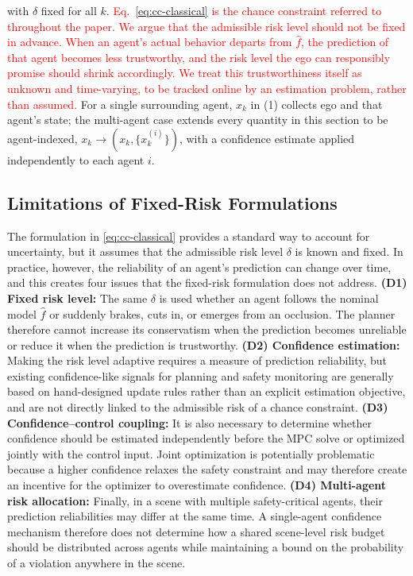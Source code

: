 \documentclass[letterpaper, 10 pt, conference]{ieeeconf}
\begin{document}
with $\delta$ fixed for all $k$. \textcolor{red}{Eq.~\eqref{eq:cc-classical} is the chance constraint referred to throughout the paper}. \textcolor{red}{We argue that the admissible risk level should not be fixed in advance. When an agent's actual behavior departs from $\hat f$, the prediction of that agent becomes less trustworthy, and the risk level the ego can responsibly promise should shrink accordingly. We treat this trustworthiness itself as unknown and time-varying, to be tracked online by an estimation problem, rather than assumed.} For a single surrounding agent, $x_k$ in (1) collects ego and that agent's state; the multi-agent case extends every quantity in this section to be agent-indexed, $x_k \to (x_k, \{x_k^{(i)}\})$, with a confidence estimate applied independently to each agent $i$.

\subsection{Limitations of Fixed-Risk Formulations}
\label{sec:difficulties}
The formulation in \eqref{eq:cc-classical} provides a standard way to account for uncertainty, but it assumes that the admissible risk level $\delta$ is known and fixed. In practice, however, the reliability of an agent's prediction can change over time, and this creates four issues that the fixed-risk formulation does not address. \textbf{(D1) Fixed risk level:} The same $\delta$ is used whether an agent follows the nominal model $\hat f$ or suddenly brakes, cuts in, or emerges from an occlusion. The planner therefore cannot increase its conservatism when the prediction becomes unreliable or reduce it when the prediction is trustworthy. \textbf{(D2) Confidence estimation:} Making the risk level adaptive requires a measure of prediction reliability, but existing confidence-like signals for planning and safety monitoring \cite{fisac2018general,tian2022safety,yao2024calmm} are generally based on hand-designed update rules rather than an explicit estimation objective, and are not directly linked to the admissible risk of a chance constraint. \textbf{(D3) Confidence--control coupling:} It is also necessary to determine whether confidence should be estimated independently before the MPC solve or optimized jointly with the control input. Joint optimization is potentially problematic because a higher confidence relaxes the safety constraint and may therefore create an incentive for the optimizer to overestimate confidence. \textbf{(D4) Multi-agent risk allocation:} Finally, in a scene with multiple safety-critical agents, their prediction reliabilities may differ at the same time. A single-agent confidence mechanism therefore does not determine how a shared scene-level risk budget should be distributed across agents while maintaining a bound on the probability of a violation anywhere in the scene.
\end{document}
